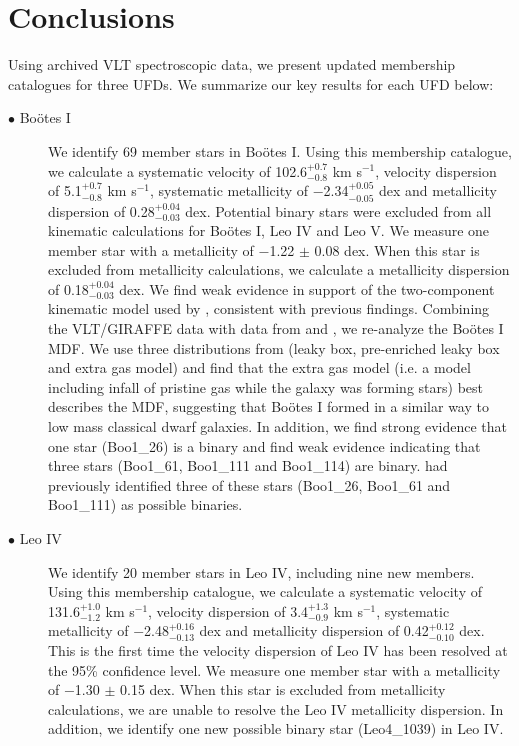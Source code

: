 \documentclass[twocolumn]{aastex63}
\newcommand{\revise}[1]{#1}
\begin{document}
\section{Conclusions}
\label{sec:conclusion}
Using archived VLT spectroscopic data, \revise{we  present updated membership catalogues for three UFDs. } We summarize our key results for each UFD below: 

\begin{description}
  \item[$\bullet$ Bo{\"o}tes I] We identify 69 member stars in Bo{\"o}tes I. Using this membership catalogue, we calculate a systematic velocity of \revise{102.6$^{+0.7}_{-0.8}$ km s$^{-1}$, velocity dispersion of 5.1$^{+0.7}_{-0.8}$ km s$^{-1}$, systematic metallicity  of $-$2.34$^{+0.05}_{-0.05}$ dex and metallicity dispersion of 0.28$^{+0.04}_{-0.03}$ dex}. \revise{Potential binary stars were excluded from all kinematic calculations for Bo{\"o}tes I, Leo IV and Leo V.} We measure one member star with a metallicity of $-$1.22 $\pm$ 0.08 dex. When this star is excluded from metallicity calculations, we calculate a metallicity dispersion of 0.18$^{+0.04}_{-0.03}$ dex. \revise{We find weak evidence in support of the two-component kinematic model used by \citet{kop2011}, consistent with previous findings.} Combining the VLT/GIRAFFE data with data from \citet{nor2010} and \citet{lai2011}, we re-analyze the Bo{\"o}tes I MDF. We use three distributions from \citet{lai2011} (leaky box, pre-enriched leaky box and extra gas model) and find that the extra gas model (i.e. a model including infall of pristine gas while the galaxy was forming stars) best describes the MDF, suggesting that Bo{\"o}tes I formed in a similar way to low mass classical dwarf galaxies. \revise{In addition, we find strong evidence that one star (Boo1\_26) is a binary and find weak evidence indicating that three stars (Boo1\_61, Boo1\_111 and Boo1\_114) are binary. \citet{kop2011} had previously identified three of these stars (Boo1\_26, Boo1\_61 and Boo1\_111) as possible binaries.}
  \item[$\bullet$ Leo IV] We identify 20 member stars in Leo IV, including nine new members. Using this membership catalogue, we calculate a systematic velocity of \revise{131.6$^{+1.0}_{-1.2}$ km s$^{-1}$, velocity dispersion of 3.4$^{+1.3}_{-0.9}$ km s$^{-1}$, systematic metallicity  of $-$2.48$^{+0.16}_{-0.13}$ dex and metallicity dispersion of 0.42$^{+0.12}_{-0.10}$ dex}. This is the first time the velocity dispersion of Leo IV has been resolved at the 95\% confidence level. We measure one member star with a metallicity of $-$1.30 $\pm$ 0.15 dex. When this star is excluded from metallicity calculations, we are unable to resolve the Leo IV metallicity dispersion. In addition, we identify one new possible binary star \revise{(Leo4\_1039)} in Leo IV. 

\end{description}
\end{document}
